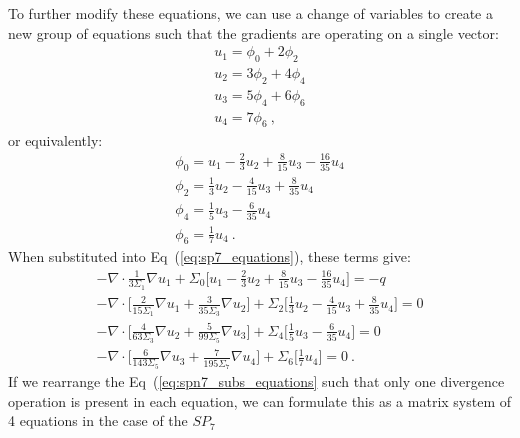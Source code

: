 To further modify these equations, we can use a change of variables to
create a new group of equations such that the gradients are operating
on a single vector:
\begin{subequations}
  \begin{gather}
    u_1 = \phi_0 + 2\phi_2 \\
    u_2 = 3\phi_2 + 4\phi_4 \\
    u_3 = 5\phi_4 + 6\phi_6 \\
    u_4 = 7\phi_6 \:,
  \end{gather}
  \label{eq:spn7_subs}
\end{subequations}
or equivalently:
\begin{subequations}
  \begin{gather}
    \phi_0 = u_1 - \frac{2}{3}u_2 + \frac{8}{15}u_3 -
    \frac{16}{35}u_4 \\
    \phi_2 = \frac{1}{3}u_2 - \frac{4}{15}u_3 + \frac{8}{35}u_4\\ 
    \phi_4 = \frac{1}{5}u_3 - \frac{6}{35}u_4\\
    \phi_6 = \frac{1}{7}u_4\:.
  \end{gather}
  \label{eq:spn7_subs_inverse}
\end{subequations}
When substituted into Eq~(\ref{eq:sp7_equations}), these terms give:
\begin{subequations}
  \begin{gather}
    -\nabla \cdot \frac{1}{3 \Sigma_1} \nabla u_1 + \Sigma_0 \Bigg[
    u_1 - \frac{2}{3}u_2 + \frac{8}{15}u_3 - \frac{16}{35}u_4 \Bigg]
    = -q \\
    -\nabla \cdot \Bigg[ \frac{2}{15 \Sigma_1} \nabla u_1 +
    \frac{3}{35 \Sigma_3} \nabla u_2 \Bigg] + \Sigma_2 \Bigg[
    \frac{1}{3}u_2 - \frac{4}{15}u_3 + \frac{8}{35}u_4 \Bigg] = 0 \\
    -\nabla \cdot \Bigg[ \frac{4}{63 \Sigma_3} \nabla u_2 +
    \frac{5}{99 \Sigma_5} \nabla u_3 \Bigg] + \Sigma_4 \Bigg[
    \frac{1}{5}u_3 - \frac{6}{35}u_4 \Bigg] = 0 \\ 
    -\nabla \cdot \Bigg[ \frac{6}{143 \Sigma_5} \nabla u_3 +
    \frac{7}{195 \Sigma_7} \nabla u_4 \Bigg] + \Sigma_6 \Bigg[
    \frac{1}{7}u_4 \Bigg] = 0 \:.
  \end{gather}
  \label{eq:spn7_subs_equations}
\end{subequations}
If we rearrange the Eq~(\ref{eq:spn7_subs_equations} such that only
one divergence operation is present in each equation, we can formulate
this as a matrix system of 4 equations in the case of the $SP_7$
